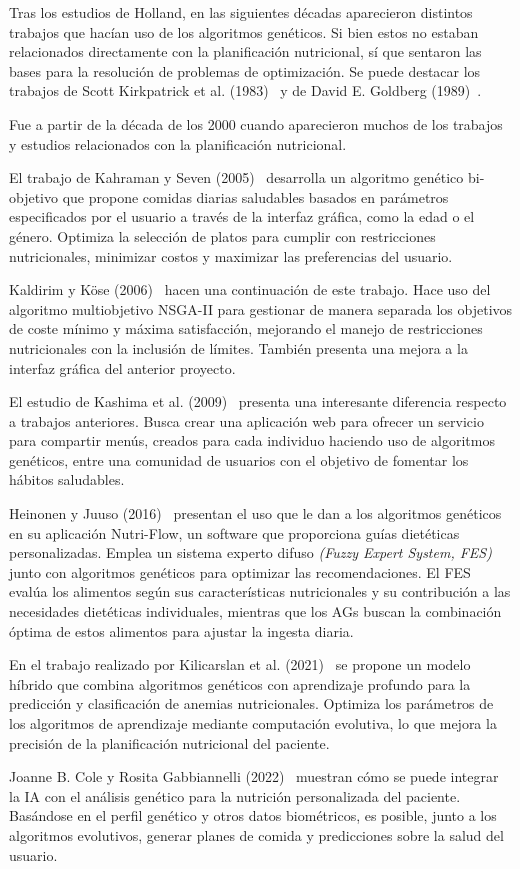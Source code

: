 Tras los estudios de Holland, en las siguientes décadas aparecieron distintos trabajos que hacían uso de los algoritmos genéticos. Si bien estos no estaban relacionados directamente con la planificación nutricional, sí que sentaron las bases para la resolución de problemas de optimización. Se puede destacar los trabajos de Scott Kirkpatrick et al. (1983)~\cite{kirkpatrick1983} y de David E. Goldberg (1989)~\cite{goldberg1989}.

Fue a partir de la década de los 2000 cuando aparecieron muchos de los trabajos y estudios relacionados con la planificación nutricional.

El trabajo de Kahraman y Seven (2005)~\cite{kahraman2005} desarrolla un algoritmo genético bi-objetivo que propone comidas diarias saludables basados en parámetros especificados por el usuario a través de la interfaz gráfica, como la edad o el género. Optimiza la selección de platos para cumplir con restricciones nutricionales, minimizar costos y maximizar las preferencias del usuario.

Kaldirim y Köse (2006)~\cite{kaldirim2006} hacen una continuación de este trabajo. Hace uso del algoritmo multiobjetivo NSGA-II para gestionar de manera separada los objetivos de coste mínimo y máxima satisfacción, mejorando el manejo de restricciones nutricionales con la inclusión de límites. También presenta una mejora a la interfaz gráfica del anterior proyecto.

El estudio de Kashima et al. (2009)~\cite{kashima2009} presenta una interesante diferencia respecto a trabajos anteriores. Busca crear una aplicación web para ofrecer un servicio para compartir menús, creados para cada individuo haciendo uso de algoritmos genéticos, entre una comunidad de usuarios con el objetivo de fomentar los hábitos saludables.

Heinonen y Juuso (2016)~\cite{heinonen2016} presentan el uso que le dan a los algoritmos genéticos en su aplicación Nutri-Flow, un software que proporciona guías dietéticas personalizadas. Emplea un sistema experto difuso \textit{(Fuzzy Expert System, FES)} junto con algoritmos genéticos para optimizar las recomendaciones. El FES evalúa los alimentos según sus características nutricionales y su contribución a las necesidades dietéticas individuales, mientras que los AGs buscan la combinación óptima de estos alimentos para ajustar la ingesta diaria.

En el trabajo realizado por Kilicarslan et al. (2021)~\cite{kilicarslan2021} se propone un modelo híbrido que combina algoritmos genéticos con aprendizaje profundo para la predicción y clasificación de anemias nutricionales. Optimiza los parámetros de los algoritmos de aprendizaje mediante computación evolutiva, lo que mejora la precisión de la planificación nutricional del paciente.

Joanne B. Cole y Rosita Gabbiannelli (2022)~\cite{cole2022} muestran cómo se puede integrar la IA con el análisis genético para la nutrición personalizada del paciente. Basándose en el perfil genético y otros datos biométricos, es posible, junto a los algoritmos evolutivos, generar planes de comida y predicciones sobre la salud del usuario.